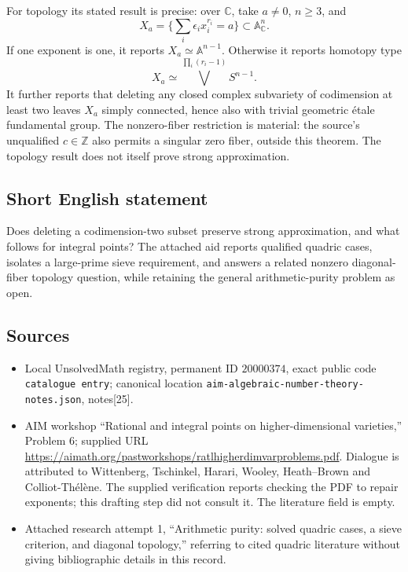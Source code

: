 \documentclass[11pt]{article}
\newcommand{\Z}{\mathbb{Z}}
\newcommand{\C}{\mathbb{C}}
\newcommand{\A}{\mathbb{A}}
\begin{document}
For topology its stated result is precise: over \(\C\), take \(a\ne0\), \(n\geq3\), and
\[
X_a=\{\sum_i\epsilon_i x_i^{r_i}=a\}\subset\A^n_{\C}.
\]
If one exponent is one, it reports \(X_a\simeq\A^{n-1}\). Otherwise it reports homotopy type
\[
X_a\simeq\bigvee^{\prod_i(r_i-1)}S^{n-1}.
\]
It further reports that deleting any closed complex subvariety of codimension at least two leaves \(X_a\) simply connected, hence also with trivial geometric \'etale fundamental group. The nonzero-fiber restriction is material: the source's unqualified \(c\in\Z\) also permits a singular zero fiber, outside this theorem. The topology result does not itself prove strong approximation.
\subsection{Short English statement}
Does deleting a codimension-two subset preserve strong approximation, and what follows for integral points? The attached aid reports qualified quadric cases, isolates a large-prime sieve requirement, and answers a related nonzero diagonal-fiber topology question, while retaining the general arithmetic-purity problem as open.
\subsection{Sources}
\begin{itemize}
\item Local UnsolvedMath registry, permanent ID \(20000374\), exact public code \texttt{catalogue entry}; canonical location \texttt{aim-algebraic-number-theory-notes.json}, notes[25].
\item AIM workshop ``Rational and integral points on higher-dimensional varieties,'' Problem 6; supplied URL \url{https://aimath.org/pastworkshops/ratlhigherdimvarproblems.pdf}. Dialogue is attributed to Wittenberg, Tschinkel, Harari, Wooley, Heath--Brown and Colliot-Th\'el\`ene. The supplied verification reports checking the PDF to repair exponents; this drafting step did not consult it. The literature field is empty.
\item Attached research attempt 1, ``Arithmetic purity: solved quadric cases, a sieve criterion, and diagonal topology,'' referring to cited quadric literature without giving bibliographic details in this record.
\end{itemize}
\end{document}
